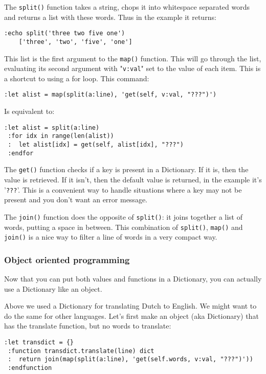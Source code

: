 The \verb!split()! function takes a string, chops it into whitespace separated words and returns a list with these words.
Thus in the example it returns:

\begin{Verbatim}[samepage=true]
 :echo split('three two five one')
    ['three', 'two', 'five', 'one']
\end{Verbatim}

This list is the first argument to the \verb!map()! function.
This will go through the list, evaluating its second argument with "\verb!v:val!" set to the value of each item.
This is a shortcut to using a for loop.
This command:

\begin{Verbatim}[samepage=true]
 :let alist = map(split(a:line), 'get(self, v:val, "???")')
\end{Verbatim}

Is equivalent to:

\begin{Verbatim}[samepage=true]
 :let alist = split(a:line)
 :for idx in range(len(alist))
 :  let alist[idx] = get(self, alist[idx], "???")
 :endfor
\end{Verbatim}

The \verb!get()! function checks if a key is present in a Dictionary.
If it is, then the value is retrieved.
If it isn't, then the default value is returned, in the example it's '\verb!???!'.
This is a convenient way to handle situations where a key may not be present and you don't want an error message.

The \verb!join()! function does the opposite of \verb!split()!: it joins together a list of words, putting a space in between.
This combination of \verb!split()!, \verb!map()! and \verb!join()! is a nice way to filter a line of words in a very compact way.

\subsubsection{Object oriented programming}
Now that you can put both values and functions in a Dictionary, you can actually use a Dictionary like an object.

Above we used a Dictionary for translating Dutch to English.
We might want to do the same for other languages.
Let's first make an object (aka Dictionary) that has the translate function, but no words to translate:

\begin{Verbatim}[samepage=true]
 :let transdict = {}
 :function transdict.translate(line) dict
 :  return join(map(split(a:line), 'get(self.words, v:val, "???")'))
 :endfunction
\end{Verbatim}

